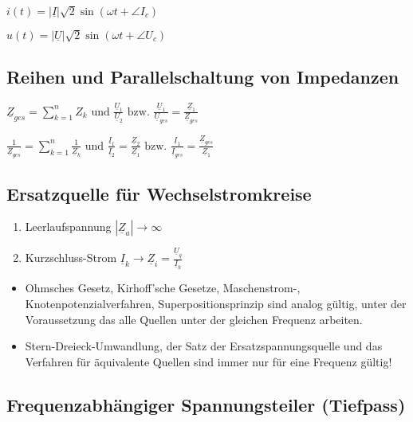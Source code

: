 \documentclass[10pt,a4paper]{scrartcl}
\begin{document}
\begin{multicols*}{3}
	
	$i(t)=|\underline{I}|\sqrt{2}\sin(\omega t+\angle I_c)$
	
	$u(t)=|\underline{U}|\sqrt{2}\sin(\omega t+\angle U_c)$ 
	
	\subsection{Reihen und Parallelschaltung von Impedanzen}
	
	$\underline{Z}_{ges}=\sum\limits_{k=1}^n{Z_k} \text{ und }\frac{\underline{U}_1}{\underline{U}_2}\text{ bzw. }\frac{\underline{U}_1}{\underline{U}_{ges}}=\frac{\underline{Z}_1}{\underline{Z}_{ges}}$
	
	$\frac{1}{\underline{Z}_{ges}}=\sum\limits_{k=1}^n{\frac{1}{\underline{Z}_k}}\text{ und }\frac{\underline{I}_1}{\underline{I}_2}=\frac{\underline{Z}_2}{\underline{Z}_1}\text{ bzw. }\frac{\underline{I}_1}{\underline{I}_{ges}}=\frac{\underline{Z}_{ges}}{\underline{Z}_1}$
	
	 
	
	\subsection{Ersatzquelle für Wechselstromkreise}
	
	\begin{enumerate}
	\compaq
	\item
	Leerlaufspannung $|\underline{Z}_a|\rightarrow\infty$
	\item
	Kurzschluss-Strom $\underline{I}_k\rightarrow \underline{Z}_i=\frac{\underline{U}_q}{\underline{I}_k}$	
	\end{enumerate}
	
	\begin{itemize}
	\compaq
	\item
	Ohmsches Gesetz, Kirhoff'sche Gesetze, Maschenstrom-, Knotenpotenzialverfahren, Superpositionsprinzip sind analog gültig, unter der Voraussetzung das alle Quellen unter der gleichen Frequenz arbeiten.
	\item
	Stern-Dreieck-Umwandlung, der Satz der Ersatzspannungsquelle und das Verfahren für äquivalente Quellen sind immer nur für eine Frequenz gültig!
	
	\end{itemize}
	
	\vfill
	\null
	\columnbreak
	 
	
	\subsection{Frequenzabhängiger Spannungsteiler (Tiefpass)}
	

\end{multicols*}
\end{document}
